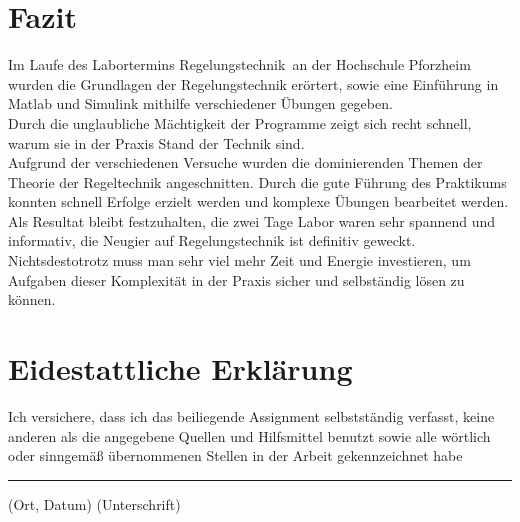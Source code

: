 \documentclass[12pt,a4paper]{scrartcl}	%
\begin{document}
\section{Fazit}
Im Laufe des Labortermins \glqq Regelungstechnik\grqq~an der Hochschule Pforzheim wurden die Grundlagen der Regelungstechnik erörtert, sowie eine Einführung in Matlab und Simulink mithilfe verschiedener Übungen gegeben.\\
Durch die unglaubliche Mächtigkeit der Programme zeigt sich recht schnell, warum sie in der Praxis Stand der Technik sind.\\
Aufgrund der verschiedenen Versuche wurden die dominierenden Themen der Theorie der Regeltechnik angeschnitten. Durch die gute Führung des Praktikums konnten schnell Erfolge erzielt werden und komplexe Übungen bearbeitet werden.\\
Als Resultat bleibt festzuhalten, die zwei Tage Labor waren sehr spannend und informativ, die Neugier auf Regelungstechnik ist definitiv geweckt. Nichtsdestotrotz muss man sehr viel mehr Zeit und Energie investieren, um Aufgaben dieser Komplexität in der Praxis sicher und selbständig lösen zu können.
 


\newpage
\section{Eidestattliche Erklärung}
\vspace{4cm}
Ich versichere, dass ich das beiliegende Assignment selbstständig verfasst, keine anderen als die angegebene Quellen
und Hilfsmittel benutzt sowie alle wörtlich oder sinngemäß übernommenen Stellen in der Arbeit gekennzeichnet habe\\
\vspace{4cm}
\hrule
\vspace{0,4cm}
(Ort, Datum)
\hspace{9,5cm}
(Unterschrift)
\end{document}
